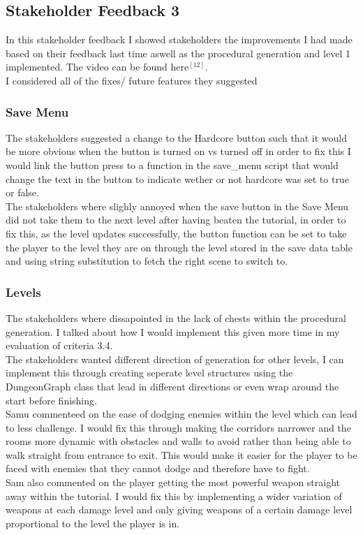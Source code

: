 \documentclass{article}
\begin{document}
        \subsection{Stakeholder Feedback 3}
        In this stakeholder feedback I showed stakeholders the improvements I had made based on their feedback last time aswell as the procedural generation and level 1 implemented. The video can be found here$^{[12]}$.\\
        I considered all of the fixes/ future features they suggested
        \subsubsection{Save Menu}
        The stakeholders suggested a change to the Hardcore button such that it would be more obvious when the button is turned on vs turned off in order to fix this I would link the button press to a function in the save\_menu script that would change the text in the button to indicate wether or not hardcore was set to true or false.\\
        The stakeholders where slighly annoyed when the save button in the Save Menu did not take them to the next level after having beaten the tutorial, in order to fix this, as the level updates successfully, the button function can be set to take the player to the level they are on through the level stored in the save data table and using string substitution to fetch the right scene to switch to.\\
        \subsubsection{Levels}
        The stakeholders where dissapointed in the lack of chests within the procedural generation. I talked about how I would implement this given more time in my evaluation of criteria 3.4.\\
        The stakeholders wanted different direction of generation for other levels, I can implement this through creating seperate level structures using the DungeonGraph class that lead in different directions or even wrap around the start before finishing.\\
        Samu commenteed on the ease of dodging enemies within the level which can lead to less challenge. I would fix this through making the corridors narrower and the rooms more dynamic with obstacles and walls to avoid rather than being able to walk straight from entrance to exit. This would make it easier for the player to be faced with enemies that they cannot dodge and therefore have to fight.\\
        Sam also commented on the player getting the most powerful weapon straight away within the tutorial. I would fix this by implementing a wider variation of weapons at each damage level and only giving weapons of a certain damage level proportional to the level the player is in.\\
\end{document}
